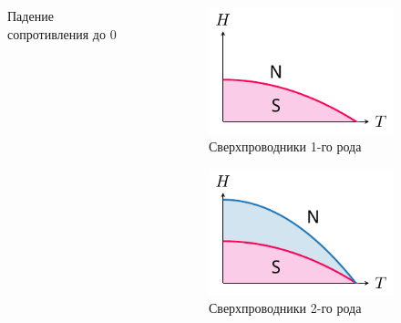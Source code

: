 \begin{frame}[t]
\begin{columns}
\begin{column}{0.49\textwidth}
\begin{figure}[h]
				\caption{Падение сопротивления до 0}
			\end{figure}
		\end{column}
		\begin{column}{0.49\textwidth}%
			\begin{figure}[h]
				\vspace{-1em}
				\includegraphics[width=0.8\linewidth]{pic/ns1}
				\vspace{-0.5em}
				\caption{Сверхпроводники 1-го рода}
			\end{figure}
			\vspace{-2em}
			\begin{figure}[h]
				\includegraphics[width=0.8\linewidth]{pic/ns2}
				\vspace{-0.5em}
				\caption{Сверхпроводники 2-го рода}
			\end{figure}
		\end{column}
	\end{columns}		
\end{frame}

